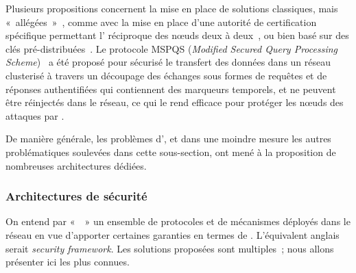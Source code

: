 Plusieurs propositions concernent la mise en place de solutions classiques, mais « allégées »~\cite{HWMRKP06}, comme avec la mise en place d'une autorité de certification spécifique permettant l' réciproque des nœuds deux à deux~\cite{GWZCK13}, ou bien basé sur des clés pré-distribuées~\cite{BSK13}.
Le protocole MSPQS (\textit{Modified Secured Query Processing Scheme})~\cite{GD14} a été proposé pour sécurisé le transfert des données dans un réseau clusterisé à travers un découpage des échanges sous formes de requêtes et de réponses authentifiées qui contiennent des marqueurs temporels, et ne peuvent être réinjectés dans le réseau, ce qui le rend efficace pour protéger les nœuds des attaques par .

De manière générale, les problèmes d', et dans une moindre mesure les autres problématiques soulevées dans cette sous-section, ont mené à la proposition de nombreuses architectures dédiées.

    \subsubsection{Architectures de sécurité}\label{ea:sss:archi}
On entend par «  » un ensemble de protocoles et de mécanismes déployés dans le réseau en vue d'apporter certaines garanties en termes de \secu.
L'équivalent anglais serait \textit{security framework}.
Les solutions proposées sont multiples~\cite{HI12,GWZC13,SS14-rev}; nous allons présenter ici les plus connues.


